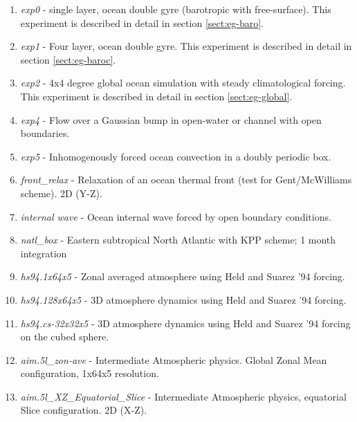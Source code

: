 \begin{enumerate}
  
\item \textit{exp0} - single layer, ocean double gyre (barotropic with
  free-surface). This experiment is described in detail in section
  \ref{sect:eg-baro}.

\item \textit{exp1} - Four layer, ocean double gyre. This experiment
  is described in detail in section \ref{sect:eg-baroc}.
  
\item \textit{exp2} - 4x4 degree global ocean simulation with steady
  climatological forcing. This experiment is described in detail in
  section \ref{sect:eg-global}.
  
\item \textit{exp4} - Flow over a Gaussian bump in open-water or
  channel with open boundaries.
  
\item \textit{exp5} - Inhomogenously forced ocean convection in a
  doubly periodic box.

\item \textit{front\_relax} - Relaxation of an ocean thermal front (test for
Gent/McWilliams scheme). 2D (Y-Z).

\item \textit{internal wave} - Ocean internal wave forced by open
  boundary conditions.
  
\item \textit{natl\_box} - Eastern subtropical North Atlantic with KPP
  scheme; 1 month integration
  
\item \textit{hs94.1x64x5} - Zonal averaged atmosphere using Held and
  Suarez '94 forcing.
  
\item \textit{hs94.128x64x5} - 3D atmosphere dynamics using Held and
  Suarez '94 forcing.
  
\item \textit{hs94.cs-32x32x5} - 3D atmosphere dynamics using Held and
  Suarez '94 forcing on the cubed sphere.
  
\item \textit{aim.5l\_zon-ave} - Intermediate Atmospheric physics.
  Global Zonal Mean configuration, 1x64x5 resolution.
  
\item \textit{aim.5l\_XZ\_Equatorial\_Slice} - Intermediate
  Atmospheric physics, equatorial Slice configuration.  2D (X-Z).
  

\end{enumerate}
